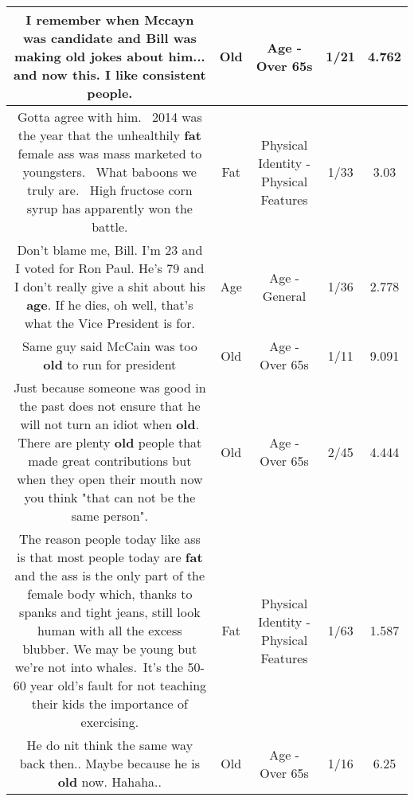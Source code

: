 \documentclass[11pt]{article}
\newlength\mylength
\begin{document}
\begin{center}
\begin{longtable}{|C{.65\mylength}|C{.30\mylength}|C{.12\mylength}|C{.12\mylength}|C{.12\mylength}|}
  \small I remember when Mccayn was candidate and Bill was making \textbf{old} jokes about him... and now this. I like consistent people.\normalsize   & Old & Age - Over 65s & 1/21 & 4.762 \\  \hline
  \small Gotta agree with him.  2014 was the year that the unhealthily \textbf{fat} female ass was mass marketed to youngsters.  What baboons we truly are.  High fructose corn syrup has apparently won the battle.\normalsize   & Fat & Physical Identity - Physical Features & 1/33 & 3.03 \\  \hline
  \small Don't blame me, Bill. I'm 23 and I voted for Ron Paul. He's 79 and I don't really give a shit about his \textbf{age}. If he dies, oh well, that's what the Vice President is for.\normalsize   & Age & Age - General & 1/36 & 2.778 \\  \hline
  \small Same guy said McCain was too \textbf{old} to run for president\normalsize   & Old & Age - Over 65s & 1/11 & 9.091 \\  \hline
  \small Just because someone was good in the past does not ensure that he will not turn an idiot when \textbf{old}. There are plenty \textbf{old} people that made great contributions but when they open their mouth now you think "that can not be the same person".\normalsize   & Old & Age - Over 65s & 2/45 & 4.444 \\  \hline
  \small The reason people today like ass is that most people today are \textbf{fat} and the ass is the only part of the female body which, thanks to spanks and tight jeans, still look human with all the excess blubber. We may be young but we're not into whales. It's the 50-60 year old's fault for not teaching their kids the importance of exercising.\normalsize   & Fat & Physical Identity - Physical Features & 1/63 & 1.587 \\  \hline
  \small He do nit think the same way back then.. Maybe because he is \textbf{old} now. Hahaha..\normalsize   & Old & Age - Over 65s & 1/16 & 6.25 \\  \hline

\end{longtable}
\end{center}
\end{document}
